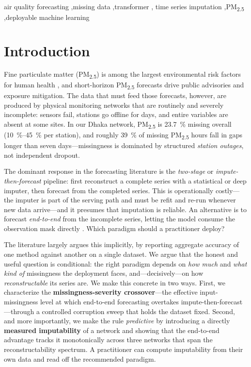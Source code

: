 \documentclass[review,3p,times]{elsarticle}
\newcommand{\pmf}{PM\textsubscript{2.5}}
\begin{document}
\begin{frontmatter}
\begin{keyword}
air quality forecasting \sep missing data \sep transformer \sep
time series imputation \sep \pmf{} \sep deployable machine learning
\end{keyword}

\end{frontmatter}

\section{Introduction}
\label{sec:intro}

Fine particulate matter (\pmf) is among the largest environmental risk factors
for human health \citep{who2021guidelines,kim2009review}, and short-horizon
\pmf{} forecasts drive public advisories and exposure mitigation. The data that
must feed those forecasts, however, are produced by physical monitoring networks
that are routinely and severely incomplete: sensors fail, stations go offline
for days, and entire variables are absent at some sites. In our Dhaka network,
\pmf{} is \SI{23.7}{\percent} missing overall (\SIrange{10}{45}{\percent} per
station), and roughly \SI{39}{\percent} of missing \pmf{} hours fall in gaps
longer than seven days---missingness is dominated by structured \emph{station
outages}, not independent dropout.

The dominant response in the forecasting literature is the \emph{two-stage} or
\emph{impute-then-forecast} pipeline: first reconstruct a complete series with a
statistical or deep imputer, then forecast from the completed series. This is
operationally costly---the imputer is part of the serving path and must be refit
and re-run whenever new data arrive---and it presumes that imputation is
reliable. An alternative is to forecast \emph{end-to-end} from the incomplete
series, letting the model consume the observation mask directly
\citep{che2018grud}. Which paradigm should a practitioner deploy?

The literature largely argues this implicitly, by reporting aggregate accuracy
of one method against another on a single dataset. We argue that the honest and
useful question is conditional: the right paradigm depends on \emph{how much} and
\emph{what kind of} missingness the deployment faces, and---decisively---on how
\emph{reconstructable} its series are. We make this concrete in two ways. First,
we characterize the \textbf{missingness-severity crossover}---the effective
input-missingness level at which end-to-end forecasting overtakes
impute-then-forecast---through a controlled corruption sweep that holds the
dataset fixed. Second, and more importantly, we make the rule \emph{predictive}
by introducing a directly \textbf{measured imputability} of a network and showing
that the end-to-end advantage tracks it monotonically across three networks that
span the reconstructability spectrum. A practitioner can compute imputability
from their own data and read off the recommended paradigm.
\end{document}

